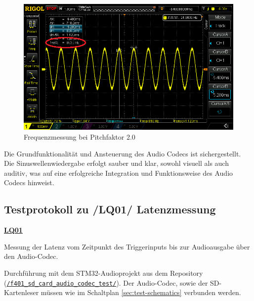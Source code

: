 \begin{figure}[H]
	\begin{minipage}[b]{0.49\textwidth}
		\centering
		\includegraphics[width=\textwidth]{images/10_test_validierung/audio/440Hz-pitch_2.0.png}
		\caption{Frequenzmessung bei Pitchfaktor 2.0}
		\label{fig:440Hz-pitch_2.0}
	\end{minipage}
\end{figure}
\label{fig:frequenzmessung-pitch}

Die Grundfunktionalität und Ansteuerung des Audio Codecs ist sichergestellt. Die Sinuswellenwiedergabe erfolgt sauber und klar, sowohl visuell als auch auditiv, was auf eine erfolgreiche Integration und Funktionsweise des Audio Codecs hinweist.

\newpage
\subsection{Testprotokoll zu /LQ01/ Latenzmessung}
\label{test-latenzmessung}

\textbf{\hyperlink{lq-latency}{LQ01}}

Messung der Latenz vom Zeitpunkt des Triggerinputs bis zur Audioausgabe über den Audio-Codec.

Durchführung mit dem STM32-Audioprojekt aus dem Repository (\href{run:../../f401_sd_card_audio_codec_test/}{\texttt{/f401\_sd\_card\_audio\_codec\_test/}}).
Der Audio-Codec, sowie der SD-Kartenleser müssen wie im Schaltplan \ref{sec:test-schematics} verbunden werden.

